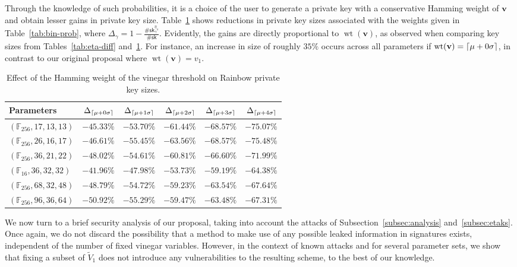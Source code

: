\documentclass[12pt, a4paper, oneside]{memoir}
\DeclareMathOperator*{\wt}{wt}
\DeclarePairedDelimiter{\ceil}{\lceil}{\rceil}
\theoremstyle{definition}
\begin{document}
Through the knowledge of such probabilities, it is a choice of the user to generate a private key with a conservative Hamming weight of $\mathbf{v}$ and obtain lesser gains in private key size. Table~\ref{tab:key-size-std} shows reductions in private key sizes associated with the weights given in Table~\ref{tab:bin-prob}, where $\Delta_{\gamma} = 1 - \frac{\#\mathsf{sk}^{\eta_{4}}_{\gamma}}{\#\mathsf{sk}}$. Evidently, the gains are directly proportional to $\wt(\mathbf{v})$, as observed when comparing key sizes from Tables~\ref{tab:eta-diff} and~\ref{tab:key-size-std}. For instance, an increase in size of roughly $35\%$ occurs across all parameters if $\wt(\mathbf{v}) = \ceil{\mu + 0\sigma}$, in contrast to our original proposal where $\wt(\mathbf{v}) = v_{1}$.

\begin{table}[htbp]
  \renewcommand{\arraystretch}{1.2}
  \centering
  \caption{Effect of the Hamming weight of the vinegar threshold on Rainbow private key sizes.}\label{tab:key-size-std}
  \begin{tabular}{l*{5}{r}}
    \toprule
    Parameters & $\Delta_{\ceil{\mu + 0\sigma}}$ 
      & $\Delta_{\ceil{\mu + 1\sigma}}$ 
      & $\Delta_{\ceil{\mu + 2\sigma}}$ 
      & $\Delta_{\ceil{\mu + 3\sigma}}$ 
      & $\Delta_{\ceil{\mu + 4\sigma}}$ \\
    \midrule
    $(\mathbb{F}_{256}, 17, 13, 13)$ & $-45.33\%$ & $-53.70\%$ & $-61.44\%$ & $-68.57\%$ & $-75.07\%$ \\
    $(\mathbb{F}_{256}, 26, 16, 17)$ & $-46.61\%$ & $-55.45\%$ & $-63.56\%$ & $-68.57\%$ & $-75.48\%$ \\
    $(\mathbb{F}_{256}, 36, 21, 22)$ & $-48.02\%$ & $-54.61\%$ & $-60.81\%$ & $-66.60\%$ & $-71.99\%$ \\
    $(\mathbb{F}_{ 16}, 36, 32, 32)$ & $-41.96\%$ & $-47.98\%$ & $-53.73\%$ & $-59.19\%$ & $-64.38\%$ \\
    $(\mathbb{F}_{256}, 68, 32, 48)$ & $-48.79\%$ & $-54.72\%$ & $-59.23\%$ & $-63.54\%$ & $-67.64\%$ \\
    $(\mathbb{F}_{256}, 96, 36, 64)$ & $-50.92\%$ & $-55.29\%$ & $-59.47\%$ & $-63.48\%$ & $-67.31\%$ \\
    \bottomrule
  \end{tabular}
\end{table}

We now turn to a brief security analysis of our proposal, taking into account the attacks of Subsection~\ref{subsec:analysis} and~\ref{subsec:etaks}. Once again, we do not discard the possibility that a method to make use of any possible leaked information in signatures exists, independent of the number of fixed vinegar variables. However, in the context of known attacks and for several parameter sets, we show that fixing a subset of $\widetilde{V}_{1}$ does not introduce any vulnerabilities to the resulting scheme, to the best of our knowledge.
\end{document}
